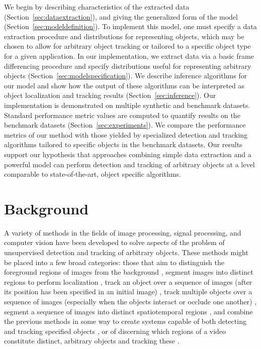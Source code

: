 \documentclass[twocolumn, final]{svjour3}
\begin{document}
We begin by describing characteristics of the extracted data (Section~\ref{sec:dataextraction}), and giving the generalized form of the model (Section~\ref{sec:modeldefinition}). To implement this model, one must specify a data extraction procedure and distributions for representing objects, which may be chosen to allow for arbitrary object tracking or tailored to a specific object type for a given application. In our implementation, we extract data via a basic frame differencing procedure and specify distributions useful for representing arbitrary objects (Section~\ref{sec:modelspecification}). We describe inference algorithms for our model and show how the output of these algorithms can be interpreted as object localization and tracking results (Section~\ref{sec:inference}). Our implementation is demonstrated on multiple synthetic and benchmark datasets. Standard performance metric values are computed to quantify results on the benchmark datasets (Section~\ref{sec:experiments}). We compare the performance metrics of our method with those yielded by specialized detection and tracking algorithms tailored to specific objects in the benchmark datasets. Our results support our hypothesis that approaches combining simple data extraction and a powerful model can perform detection and tracking of arbitrary objects at a level comparable to state-of-the-art, object specific algorithms.




\section{Background}
\label{sec:priorwork}

A variety of methods in the fields of image processing, signal processing, and computer vision have been developed to solve aspects of the problem of unsupervised detection and tracking of arbitrary objects. These methods might be placed into a few broad categories: those that aim to distinguish the foreground regions of images from the background \cite{hong2007real,chien2002efficient, zhang2007moving, kim2002fast}, segment images into distinct regions to perform localization \cite{jain1997object, fei2005bayesian, sivic2005discovering}, track an object over a sequence of images (after its position has been specified in an initial image) \cite{raja_1998, mckenna_1999, jepson_2003, comaniciu_2003, perez_2002}, track multiple objects over a sequence of images (especially when the objects interact or occlude one another) \cite{senior2006appearance, cucchiara2004probabilistic, zhou2003background, han_2004, mckenna2000tracking, dockstader2001multiple}, segment a sequence of images into distinct spatiotemporal regions \cite{brox2003unsupervised, sista2000unsupervised, wang1998unsupervised}, and combine the previous methods in some way to create systems capable of both detecting and tracking specified objects \cite{Okuma04aboosted,eth_biwi_00633,4036928, khan_2004, leibe2008coupled}, or of discerning which regions of a video constitute distinct, arbitrary objects and tracking these \cite{brostow2006unsupervised, brox2010object, fragkiadaki2011detection, pece_2002,paragios2000geodesic}.
\end{document}
